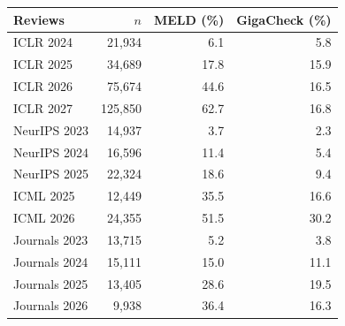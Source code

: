 \begin{tabular}{@{}lrrr@{}}
\toprule
Reviews & $n$ & MELD (\%) & GigaCheck (\%) \\
\midrule
ICLR 2024 & 21,934 & 6.1 & 5.8 \\
ICLR 2025 & 34,689 & 17.8 & 15.9 \\
ICLR 2026 & 75,674 & 44.6 & 16.5 \\
ICLR 2027 & 125,850 & 62.7 & 16.8 \\
\midrule
NeurIPS 2023 & 14,937 & 3.7 & 2.3 \\
NeurIPS 2024 & 16,596 & 11.4 & 5.4 \\
NeurIPS 2025 & 22,324 & 18.6 & 9.4 \\
\midrule
ICML 2025 & 12,449 & 35.5 & 16.6 \\
ICML 2026 & 24,355 & 51.5 & 30.2 \\
\midrule
Journals 2023 & 13,715 & 5.2 & 3.8 \\
Journals 2024 & 15,111 & 15.0 & 11.1 \\
Journals 2025 & 13,405 & 28.6 & 19.5 \\
Journals 2026 & 9,938 & 36.4 & 16.3 \\
\bottomrule
\end{tabular}

